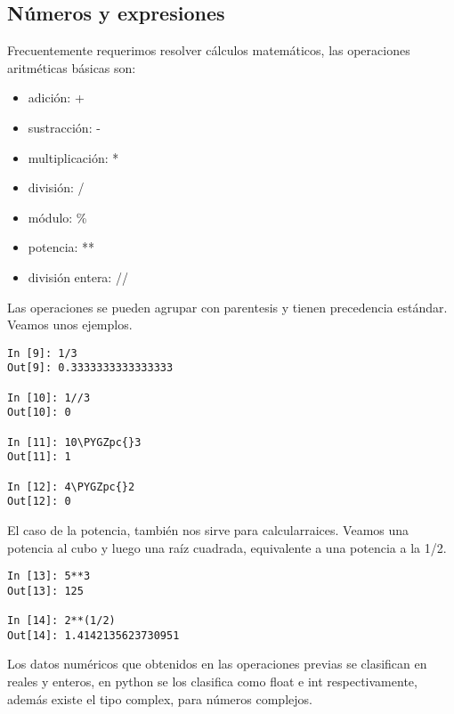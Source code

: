 \documentclass[letterpaper,10pt,spanish]{sphinxmanual}
\def\PYGZpc{\char`\%}
\begin{document}
\subsection{Números y expresiones}
\label{Unidad01:numeros-y-expresiones}
Frecuentemente requerimos resolver cálculos matemáticos, las operaciones
aritméticas básicas son:
\begin{itemize}
\item {} 
adición: +

\item {} 
sustracción: -

\item {} 
multiplicación: *

\item {} 
división: /

\item {} 
módulo: \%

\item {} 
potencia: **

\item {} 
división entera: //

\end{itemize}

Las operaciones se pueden agrupar con parentesis y tienen precedencia
estándar. Veamos unos ejemplos.

\begin{Verbatim}[commandchars=\\\{\}]
In [9]: 1/3
Out[9]: 0.3333333333333333

In [10]: 1//3
Out[10]: 0

In [11]: 10\PYGZpc{}3
Out[11]: 1

In [12]: 4\PYGZpc{}2
Out[12]: 0
\end{Verbatim}

El caso de la potencia, también nos sirve para calcularraices. Veamos
una potencia al cubo y luego una raíz cuadrada, equivalente a una
potencia a la 1/2.

\begin{Verbatim}[commandchars=\\\{\}]
In [13]: 5**3
Out[13]: 125

In [14]: 2**(1/2)
Out[14]: 1.4142135623730951
\end{Verbatim}

Los datos numéricos que obtenidos en las operaciones previas se
clasifican en reales y enteros, en python se los clasifica como float e
int respectivamente, además existe el tipo complex, para números
complejos.
\end{document}
